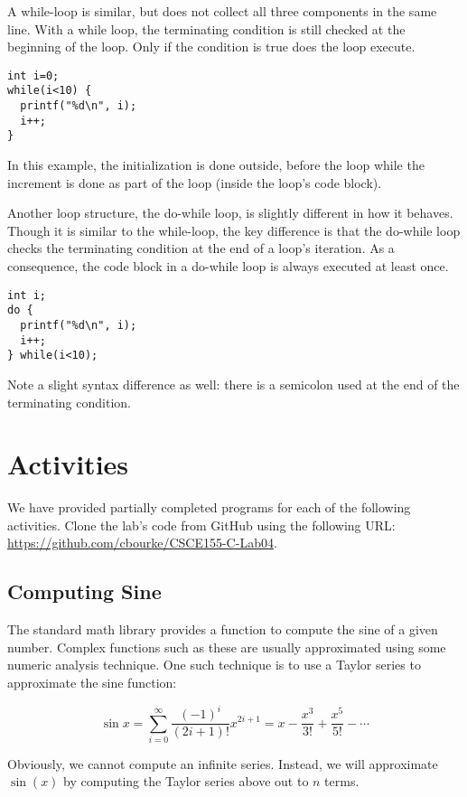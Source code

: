 \documentclass[12pt]{scrartcl}
\begin{document}
A while-loop is similar, but does not collect all three components 
in the same line.  With a while loop, the terminating condition is 
still checked at the beginning of the loop.  Only if the condition is 
true does the loop execute.  

\begin{verbatim}
int i=0;
while(i<10) {
  printf("%d\n", i);
  i++;
}
\end{verbatim}

In this example, the initialization is done outside, before the loop 
while the increment is done as part of the loop (inside the loop's 
code block).  

Another loop structure, the do-while loop, is slightly different in 
how it behaves.  Though it is similar to the while-loop, the key 
difference is that the do-while loop checks the terminating condition 
at the end of a loop's iteration.  As a consequence, the code block 
in a do-while loop is always executed at least once.

\begin{verbatim}
int i;
do {
  printf("%d\n", i);
  i++;
} while(i<10);
\end{verbatim}

Note a slight syntax difference as well: there is a semicolon used 
at the end of the terminating condition. 

\section{Activities}

We have provided partially completed programs for each of the 
following activities.  Clone the lab's code from GitHub using the 
following URL: \url{https://github.com/cbourke/CSCE155-C-Lab04}.

\subsection{Computing Sine}

The standard math library provides a function to compute the sine 
of a given number.  Complex functions such as these are usually 
approximated using some numeric analysis technique.  One such 
technique is to use a Taylor series to approximate the sine function:

$$\sin{x} = \sum_{i=0}^\infty \frac{(-1)^i}{(2i+1)!} x^{2i+1} = x - \frac{x^3}{3!}+\frac{x^5}{5!}-\cdots$$

Obviously, we cannot compute an infinite series.  Instead, we will 
approximate $\sin(x)$ by computing the Taylor series above out to $n$ 
terms.
\end{document}
